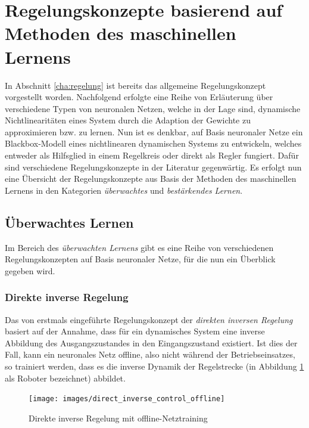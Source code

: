 \section{Regelungskonzepte basierend auf Methoden des maschinellen Lernens}

In Abschnitt \ref{cha:regelung} ist bereits das allgemeine Regelungskonzept vorgestellt worden. Nachfolgend erfolgte eine Reihe von Erläuterung über verschiedene Typen von neuronalen Netzen, welche in der Lage sind, dynamische Nichtlinearitäten eines System durch die Adaption der Gewichte zu approximieren bzw. zu lernen. Nun ist es denkbar, auf Basis neuronaler Netze ein Blackbox-Modell eines nichtlinearen dynamischen Systems zu entwickeln, welches entweder als Hilfsglied in einem Regelkreis oder direkt als Regler fungiert. Dafür sind verschiedene Regelungskonzepte in der Literatur gegenwärtig. Es erfolgt nun eine Übersicht der Regelungskonzepte aus Basis der Methoden des maschinellen Lernens in den Kategorien \textit{überwachtes} und \textit{bestärkendes Lernen}.\\


\subsection{Überwachtes Lernen} 
\label{cha:supervised}
Im Bereich des \textit{überwachten Lernens} gibt es eine Reihe von verschiedenen Regelungskonzepten auf Basis neuronaler Netze, für die nun ein Überblick gegeben wird.


\subsubsection{Direkte inverse Regelung}
\label{cha:direct_inverse}
Das von \cite{Werbos.2014} erstmals eingeführte Regelungskonzept der \textit{direkten inversen Regelung} basiert auf der Annahme, dass für ein dynamisches System eine inverse Abbildung des Ausgangszustandes in den Eingangszustand existiert.  Ist dies der Fall, kann ein neuronales Netz offline, also nicht während der Betriebseinsatzes, so trainiert werden, dass es die inverse Dynamik der Regelstrecke (in Abbildung \ref{fig:direct_inverse_offline} als Roboter bezeichnet) abbildet. \\ 

\begin{figure} [h]
	\centering
	\texttt{[image: images/direct\_inverse\_control\_offline]}
	\caption{Direkte inverse Regelung mit offline-Netztraining \cite{Sklyarenko.2002}}
	\label{fig:direct_inverse_offline}
\end{figure}

